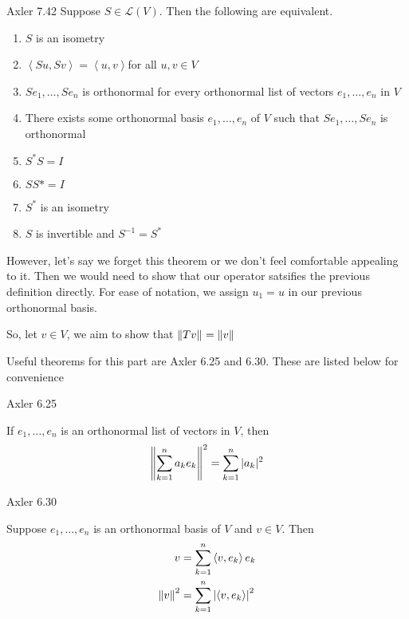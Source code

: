 \documentclass[answers]{exam}
\renewcommand{\L}[1]{\mathcal{L}\left(#1\right)}
\newcommand{\ip}[1]{\left\langle#1\right\rangle}
\begin{document}
\begin{questions}
\begin{parts}
\begin{solution}
            \begin{theorem} Axler 7.42
                Suppose $S\in\L{V}$. Then the following are equivalent.
                \begin{enumerate}
                    \item $S$ is an isometry
                    \item $\ip{Su,Sv} = \ip{u,v}$\qquad\qquad for all $u,v\in V$
                    \item $Se_1,\dots,Se_n$ is orthonormal for every orthonormal list of vectors
                        $e_1,\dots,e_n$ in $V$
                    \item There exists some orthonormal basis $e_1,\dots,e_n$ of $V$ such that 
                        $Se_1,\dots,Se_n$ is orthonormal
                    \item $S^*S = I$
                    \item $SS* = I$
                    \item $S^*$ is an isometry 
                    \item $S$ is invertible and $S^{-1} = S^*$
                \end{enumerate}
            \end{theorem}

            However, let's say we forget this theorem or we don't feel comfortable appealing to it. Then we would
            need to show that our operator satsifies the previous definition directly. For ease of notation, we
            assign $u_1 = u$ in our previous orthonormal basis.

            So, let $v\in V$, we aim to show that $\left\|Tv\right\|_{} = \left\|v\right\|_{}$

            Useful theorems for this part are Axler 6.25 and 6.30. These are listed below for convenience

            \begin{theorem} Axler 6.25 \label{thm:625}

                If $e_1,\dots,e_n$ is an orthonormal list of vectors in $V$, then 
                \[
                    \left\|\sum_{k=1}^na_ke_k\right\|_{}^2 = \sum_{k=1}^n |a_k|^2
                \]
            \end{theorem} 

            \begin{theorem} Axler 6.30 \label{thm:630}

                Suppose $e_1,\dots,e_n$ is an orthonormal basis of $V$ and $v\in V$. Then
                \begin{align}
                    v &= \sum_{k=1}^n \ip{v,e_k}e_k \nonumber\\
                    \norm{v}{}^2 &= \sum_{k=1}^n\left|\ip{v,e_k}\right|^2\label{eq:normV}
                \end{align}
            \end{theorem}


\end{solution}
\end{parts}
\end{questions}
\end{document}
